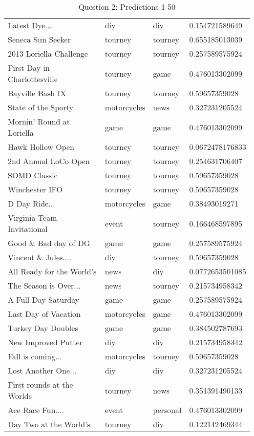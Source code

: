 \begin{table}[h!]
\begin{tabular}{| l | l | l | l |}
Latest Dye... & diy & diy & 0.154721589649 \\
Seneca Sun Seeker & tourney & tourney & 0.655185013039 \\
2013 Loriella Challenge & tourney & tourney & 0.257589575924 \\
First Day in Charlottesville & tourney & game & 0.476013302099 \\
Bayville Bash IX & tourney & tourney & 0.59657359028 \\
State of the Sporty & motorcycles & news & 0.327231205524 \\
Mornin' Round at Loriella & game & game & 0.476013302099 \\
Hawk Hollow Open & tourney & tourney & 0.0672478176833 \\
2nd Annual LoCo Open & tourney & tourney & 0.254631706407 \\
SOMD Classic & tourney & tourney & 0.59657359028 \\
Winchester IFO & tourney & tourney & 0.59657359028 \\
D Day Ride... & motorcycles & game & 0.38493019271 \\
Virginia Team Invitational & event & tourney & 0.166468597895 \\
Good \& Bad day of DG & game & game & 0.257589575924 \\
Vincent \& Jules.... & diy & tourney & 0.59657359028 \\
All Ready for the World's & news & diy & 0.0772653501085 \\
The Season is Over... & news & tourney & 0.215734958342 \\
A Full Day Saturday & game & game & 0.257589575924 \\
Last Day of Vacation & motorcycles & game & 0.476013302099 \\
Turkey Day Doubles & game & game & 0.384502787693 \\
New Improved Putter & diy & diy & 0.215734958342 \\
Fall is coming... & motorcycles & tourney & 0.59657359028 \\
Lost Another One... & diy & diy & 0.327231205524 \\
First rounds at the Worlds & tourney & news & 0.351391490133 \\
Ace Race Fun.... & event & personal & 0.476013302099 \\
Day Two at the World's & tourney & diy & 0.122142469344 \\
\hline
\end{tabular}
\caption{Question 2: Predictions 1-50}
\label{tab:one}
\end{table}

